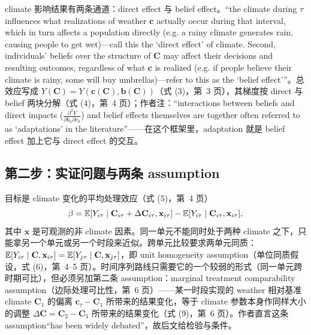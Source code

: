 climate 影响结果有两条通道：direct effect 与 belief effect。``the climate during $\tau$ influences what realizations of weather $\mathbf{c}$ actually occur during that interval, which in turn affects a population directly (e.g. a rainy climate generates rain, causing people to get wet)—call this the `direct effect' of climate. Second, individuals' beliefs over the structure of $\mathbf{C}$ may affect their decisions and resulting outcomes, regardless of what $\mathbf{c}$ is realized (e.g. if people believe their climate is rainy, some will buy umbrellas)—refer to this as the `belief effect'''\citep[第~3 页]{hsiang2016climate}。总效应写成 $Y(\mathbf{C}) = Y(\mathbf{c}(\mathbf{C}), \mathbf{b}(\mathbf{C}))$（式 (3)，第~3 页），其梯度按 direct 与 belief 两块分解（式 (4)，第~4 页）；作者注：``interactions between beliefs and direct impacts ($\frac{\partial^2 Y}{\partial b_n\partial c_k}$) and belief effects themselves are together often referred to as `adaptations' in the literature''\citep[第~4 页]{hsiang2016climate}——在这个框架里，adaptation 就是 belief effect 加上它与 direct effect 的交互。

\subsection{第二步：实证问题与两条 assumption}

目标是 climate 变化的平均处理效应（式 (5)，第~4 页）
\begin{equation}
\beta = \mathbb{E}[Y_{i\tau}\mid\mathbf{C}_{i\tau}+\Delta\mathbf{C}_{i\tau}, \mathbf{x}_{i\tau}] - \mathbb{E}[Y_{i\tau}\mid\mathbf{C}_{i\tau}, \mathbf{x}_{i\tau}] ,
\label{eq:hs-ate}
\end{equation}
其中 $\mathbf{x}$ 是可观测的非 climate 因素。同一单元不能同时处于两种 climate 之下，只能拿另一个单元或另一个时段来近似。跨单元比较要求两单元同质：$\mathbb{E}[Y_{i\tau}\mid\mathbf{C},\mathbf{x}_{i\tau}] = \mathbb{E}[Y_{j\tau}\mid\mathbf{C},\mathbf{x}_{j\tau}]$，即 unit homogeneity assumption（单位同质假设，式 (6)，第~4--5 页）。时间序列路线只需要它的一个较弱的形式（同一单元跨时期可比），但必须另加第二条 assumption：marginal treatment comparability assumption（边际处理可比性，第~6 页）——某一时段实现的 weather 相对基准 climate $\mathbf{C}_1$ 的偏离 $\mathbf{c}_{\tau}-\mathbf{C}_1$ 所带来的结果变化，等于 climate 参数本身作同样大小的调整 $\Delta\mathbf{C} = \mathbf{C}_2-\mathbf{C}_1$ 所带来的结果变化（式 (9)，第~6 页）。作者直言这条 assumption``has been widely debated''\citep[第~6 页]{hsiang2016climate}，故后文给检验与条件。

